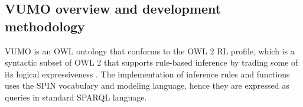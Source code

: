 \documentclass[]{interact}
\theoremstyle{plain}%
\theoremstyle{definition}
\theoremstyle{remark}
\theoremstyle{definition}
\begin{document}
\subsection{VUMO overview and development methodology}
\label{sec:vumooverview}

VUMO is an OWL ontology that conforms to the OWL 2 RL profile, which is a syntactic subset of OWL 2 that supports rule-based inference by trading some of its logical expressiveness \citep{owl}. The implementation of inference rules and functions uses the SPIN vocabulary and modeling language, hence they are expressed as queries in standard SPARQL language.
%
%
%
%
%
\end{document}
